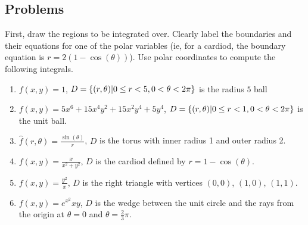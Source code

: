 \documentclass[letterpaper,11pt]{article}
\begin{document}
\subsection*{Problems}
First, draw the regions to be integrated over.
Clearly label the boundaries and their equations for one of the polar variables (ie, for a cardiod, the boundary equation is $r = 2 (1 - \cos(\theta))$).
Use polar coordinates to compute the following integrals.
\begin{enumerate}
  \item $f(x, y) = 1$, $D = \{ (r, \theta) | 0 \leq r < 5, 0 < \theta < 2 \pi \}$ is the radius $5$ ball\\
    \newline
    \newline
    \newline
    \newline
    \newline
  \item $f(x, y) = 5 x^6 + 15 x^4 y^2 + 15 x^2 y^4 + 5 y^4$, $D = \{ (r, \theta) | 0 \leq r < 1, 0 < \theta < 2 \pi \}$ is the unit ball.
    \newline
    \newline
    \newline
    \newline
    \newline
  \item $\hat{f}(r, \theta) = \frac{\sin(\theta)}{r}$, $D$ is the torus with inner radius 1 and outer radius 2.
    \newline
    \newline
    \newline
    \newline
    \newline
  \item $f(x, y) = \frac{x}{x^2 + y^2}$, $D$ is the cardiod defined by $r = 1 - \cos(\theta)$.
    \newline
    \newline
    \newline
    \newline
    \newline
  \item $f(x, y) = \frac{y^2}{x}$, $D$ is the right triangle with vertices $(0, 0)$, $(1, 0)$, $(1, 1)$.
    \newline
    \newline
    \newline
    \newline
    \newline
  \item $f(x, y) = e^{x^2} x y$,
    $D$ is the wedge between the unit circle and the rays from the origin at $\theta = 0$ and $\theta = \frac{2}{3} \pi$.
    \newline
    \newline
    \newline
    \newline
    \newline
\end{enumerate}
\end{document}

